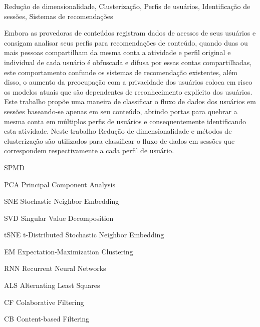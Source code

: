 \documentclass[ecp,tc,english]{iiufrgs}
\begin{document}
\begin{englishabstract}{}{Redução de dimensionalidade, Clusterização, Perfis de usuários, Identificação de sessões, Sistemas de recomendações}

  Embora as provedoras de conteúdos registram dados de acessos de seus usuários e consigam analisar seus perfis para recomendações de conteúdo, quando duas ou mais pessoas compartilham da mesma conta a atividade e perfil original e individual de cada usuário é obfuscada e difusa por essas contas compartilhadas, este comportamento confunde os sistemas de recomendação existentes, além disso, o aumento da preocupação com a privacidade dos usuários coloca em risco os modelos atuais que são dependentes de reconhecimento explícito dos usuários.
  Este trabalho propõe uma maneira de classificar o fluxo de dados dos usuários em sessões baseando-se apenas em seu conteúdo, abrindo portas para quebrar a mesma conta em múltiplos perfis de usuários e consequentemente identificando esta atividade. Neste trabalho Redução de dimensionalidade e métodos de clusterização são utilizados para classificar o fluxo de dados em sessões que correspondem respectivamente a cada perfil de usuário.
\end{englishabstract}

\listoffigures 
\listoftables 

\begin{listofabbrv}{SPMD}
    \item[PCA] Principal Component Analysis
    \item[SNE] Stochastic Neighbor Embedding
    \item[SVD] Singular Value Decomposition
    \item[tSNE] t-Distributed Stochastic Neighbor Embedding
    \item[EM] Expectation-Maximization Clustering
    \item[RNN] Recurrent Neural Networks
    \item[ALS] Alternating Least Squares    
    \item[CF] Colaborative Filtering
    \item[CB] Content-based Filtering
\end{listofabbrv}

\tableofcontents %


\end{document}

